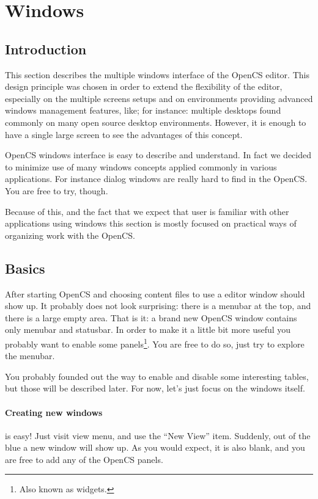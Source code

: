 \section{Windows}
\subsection{Introduction}
This section describes the multiple windows interface of the OpenCS editor. This design principle was chosen in order
to extend the flexibility of the editor, especially on the multiple screens setups and on environments providing advanced
windows management features, like; for instance: multiple desktops found commonly on many open source desktop environments.
However, it is enough to have a single large screen to see the advantages of this concept.

OpenCS windows interface is easy to describe and understand. In fact we decided to minimize use of many windows concepts
applied commonly in various applications. For instance dialog windows are really hard to find in the OpenCS. You are free to try,
though.

Because of this, and the fact that we expect that user is familiar with other applications using windows this section is mostly
focused on practical ways of organizing work with the OpenCS.

\subsection{Basics}
After starting Open{CS} and choosing content files to use a editor window should show up. It probably does not look surprising:
there is a menubar at the top, and there is a large empty area. That is it: a brand new Open{CS} window contains only menubar
and statusbar. In order to make it a little bit more useful you probably want to enable some panels\footnote{Also known as widgets.}.
You are free to do so, just try to explore the menubar.

You probably founded out the way to enable and disable some interesting tables, but those will be described later. For now, let's
just focus on the windows itself.

\paragraph{Creating new windows}
is easy! Just visit view menu, and use the ``New View'' item. Suddenly, out of the blue a new window will show up. As you would expect,
it is also blank, and you are free to add any of the Open{CS} panels.

